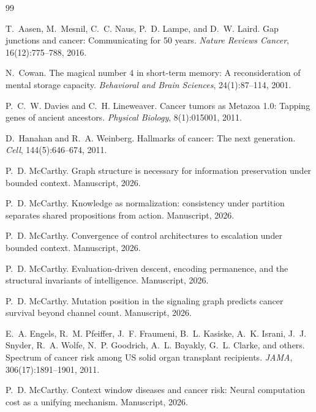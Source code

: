 \documentclass[11pt]{article}
\begin{document}

\begin{thebibliography}{99}

T.~Aasen, M.~Mesnil, C.~C. Naus, P.~D. Lampe, and D.~W. Laird.
\newblock Gap junctions and cancer: Communicating for 50 years.
\newblock \emph{Nature Reviews Cancer}, 16(12):775--788, 2016.

N.~Cowan.
\newblock The magical number 4 in short-term memory: A reconsideration of
  mental storage capacity.
\newblock \emph{Behavioral and Brain Sciences}, 24(1):87--114, 2001.

P.~C.~W. Davies and C.~H. Lineweaver.
\newblock Cancer tumors as {Metazoa} 1.0: Tapping genes of ancient ancestors.
\newblock \emph{Physical Biology}, 8(1):015001, 2011.

D.~Hanahan and R.~A. Weinberg.
\newblock Hallmarks of cancer: The next generation.
\newblock \emph{Cell}, 144(5):646--674, 2011.

P.~D. McCarthy.
\newblock Graph structure is necessary for information preservation under
  bounded context.
\newblock Manuscript, 2026.

P.~D. McCarthy.
\newblock Knowledge as normalization: consistency under partition separates
  shared propositions from action.
\newblock Manuscript, 2026.

P.~D. McCarthy.
\newblock Convergence of control architectures to escalation under bounded context.
\newblock Manuscript, 2026.

P.~D. McCarthy.
\newblock Evaluation-driven descent, encoding permanence, and the structural
  invariants of intelligence.
\newblock Manuscript, 2026.

P.~D. McCarthy.
\newblock Mutation position in the signaling graph predicts cancer survival
  beyond channel count.
\newblock Manuscript, 2026.

E.~A. Engels, R.~M. Pfeiffer, J.~F. Fraumeni, B.~L. Kasiske,
  A.~K. Israni, J.~J. Snyder, R.~A. Wolfe, N.~P. Goodrich,
  A.~L. Bayakly, G.~L. Clarke, and others.
\newblock Spectrum of cancer risk among {US} solid organ transplant
  recipients.
\newblock \emph{JAMA}, 306(17):1891--1901, 2011.

P.~D. McCarthy.
\newblock Context window diseases and cancer risk: Neural computation
  cost as a unifying mechanism.
\newblock Manuscript, 2026.


\end{thebibliography}
\end{document}
